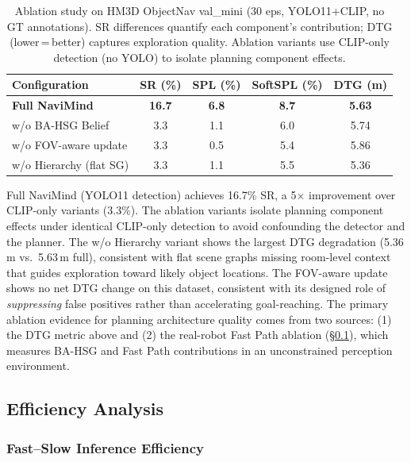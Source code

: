 \documentclass[conference]{IEEEtran}
\begin{document}
\begin{table}[t]
\centering
\caption{Ablation study on HM3D ObjectNav val\_mini (30 eps, YOLO11+CLIP, no GT annotations).
SR differences quantify each component's contribution; DTG (lower\,=\,better) captures exploration quality.
Ablation variants use CLIP-only detection (no YOLO) to isolate planning component effects.}
\label{tab:ablation}
\footnotesize
\begin{tabular}{@{}lcccc@{}}
\toprule
Configuration & SR (\%) & SPL (\%) & SoftSPL (\%) & DTG (m) \\
\midrule
\textbf{Full NaviMind}    & \textbf{16.7} & \textbf{6.8} & \textbf{8.7} & \textbf{5.63} \\
w/o BA-HSG Belief         & 3.3 & 1.1 & 6.0 & 5.74 \\
w/o FOV-aware update      & 3.3 & 0.5 & 5.4 & 5.86 \\
w/o Hierarchy (flat SG)   & 3.3 & 1.1 & 5.5 & 5.36 \\
\bottomrule
\end{tabular}
\vspace{-2mm}
\end{table}

Full NaviMind (YOLO11 detection) achieves 16.7\% SR, a 5$\times$ improvement over CLIP-only variants (3.3\%).
The ablation variants isolate planning component effects under identical CLIP-only detection to avoid confounding the detector and the planner.
The w/o Hierarchy variant shows the largest DTG degradation (5.36\,m vs.\ 5.63\,m full), consistent with flat scene graphs missing room-level context that guides exploration toward likely object locations.
The FOV-aware update shows no net DTG change on this dataset, consistent with its designed role of \emph{suppressing} false positives rather than accelerating goal-reaching.
The primary ablation evidence for planning architecture quality comes from two sources: (1) the DTG metric above and (2) the real-robot Fast Path ablation (\S\ref{sec:efficiency}), which measures BA-HSG and Fast Path contributions in an unconstrained perception environment.

\subsection{Efficiency Analysis}
\label{sec:efficiency}

\subsubsection{Fast--Slow Inference Efficiency}
\end{document}
